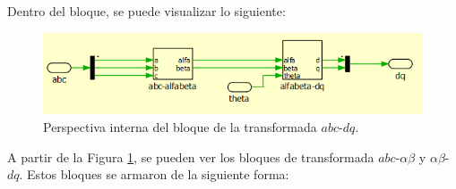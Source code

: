 Dentro del bloque, se puede visualizar lo siguiente:

\begin{figure}
    \centering
    \includegraphics[width=0.5\linewidth]{Tarea 1/report/imagenes/p1a/transformadapordentro.png}
    \caption{Perspectiva interna del bloque de la transformada $abc$-$dq$.}
    \label{transformadapordentro}
\end{figure}

A partir de la Figura \ref{transformadapordentro}, se pueden ver los bloques de transformada $abc$-$\alpha\beta$ y $\alpha\beta$-$dq$. Estos bloques se armaron de la siguiente forma:

